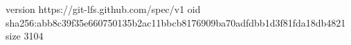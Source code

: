 version https://git-lfs.github.com/spec/v1
oid sha256:abb8c39f35e660750135b2ac11bbcb8176909ba70adfdbb1d3f81fda18db4821
size 3104
